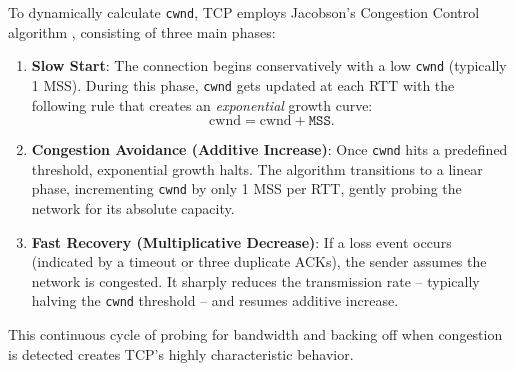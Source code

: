 To dynamically calculate \texttt{cwnd}, TCP employs Jacobson's Congestion Control algorithm \cite{jacobson1988} \cite{rfc5681}, consisting of three main phases:
\begin{enumerate}
    \item \textbf{Slow Start}: The connection begins conservatively with a low \texttt{cwnd} (typically 1 MSS). During this phase, \texttt{cwnd} gets updated at each RTT with the following rule that creates an \emph{exponential} growth curve:
\[
    \text{cwnd} = \text{cwnd} + \texttt{MSS}.
\]
    \item \textbf{Congestion Avoidance (Additive Increase)}: Once \texttt{cwnd} hits a predefined threshold, exponential growth halts. The algorithm transitions to a linear phase, incrementing \texttt{cwnd} by only 1 MSS per RTT, gently probing the network for its absolute capacity.
    \item \textbf{Fast Recovery (Multiplicative Decrease)}: If a loss event occurs (indicated by a timeout or three duplicate ACKs), the sender assumes the network is congested. It sharply reduces the transmission rate -- typically halving the \texttt{cwnd} threshold -- and resumes additive increase.
\end{enumerate}

This continuous cycle of probing for bandwidth and backing off when congestion is detected creates TCP's highly characteristic  behavior.

